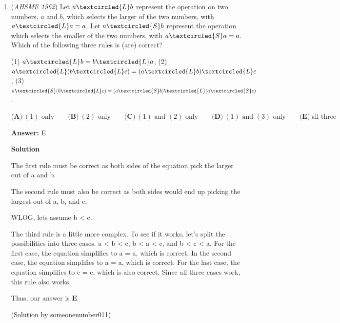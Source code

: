 \begin{enumerate}
Let $f(x) = 8x-3x^2$ Since $f(x)$ is a quadratic and the quadratic term is negative, the maximum will be $f\bigg(- \dfrac{b}{2a}\bigg)$ when written in the form $ax^2+bx+c$. We see that $a=-3$, and so $- \dfrac{b}{2a} = -\bigg( \dfrac{8}{-6}\bigg) = \dfrac{4}{3}$. Plugging in this value yields $f(\dfrac{4}{3}) = \dfrac{32}{3}-3 \cdot \dfrac{16}{9} = \dfrac{32}{3} - \dfrac{16}{3} = \boxed{\text{E}\ \dfrac{16}{3}}$



	\item (\textit{AHSME 1962}) Let $a \textcircled{L} b$ represent the operation on two numbers, $a$ and $b$, which selects the larger of the two numbers, with $a \textcircled{L} a = a$. Let $a \textcircled{S} b$ represent the operation which selects the smaller of the two numbers, with $a \textcircled{S} a = a$. Which of the following three rules is (are) correct?


 (1) $a \textcircled{L} b = b \textcircled{L} a$, (2) $a \textcircled{L} (b \textcircled{L} c) = (a \textcircled{L} b) \textcircled{L} c$,
(3) $a \textcircled{S} (b \textcircled{L} c) = (a \textcircled{S} b) \textcircled{L} (a \textcircled{S} c)$.


 $\textbf{(A)}\ (1)\text{ only} \qquad  \textbf{(B)}\ (2)\text{ only} \qquad  \textbf{(C)}\ (1)\text{ and }(2)\text{ only} \qquad  \textbf{(D)}\ (1)\text{ and }(3)\text{ only} \qquad  \textbf{(E)}\ \text{all three}$

 \textbf{Answer: }E



\textbf{Solution}

The first rule must be correct as both sides of the equation pick the larger out of a and b.

 The second rule must also be correct as both sides would end up picking the largest out of a, b, and c.

 WLOG, lets assume b < c.

 The third rule is a little more complex. To see if it works, let’s split the possibilities into three cases. a < b < c, b < a < c, and b < c < a. For the first case, the equation simplifies to a = a, which is correct. In the second case, the equation simplifies to a = a, which is correct. For the last case, the equation simplifies to c = c, which is also correct. Since all three cases work, this rule also works.

 Thus, our answer is $\boxed{\textbf{E}}$

 (Solution by someonenumber011)


\end{enumerate}
